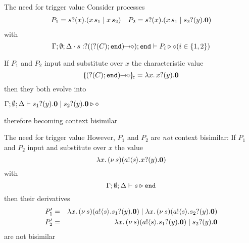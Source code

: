 \documentclass{beamer}
\begin{document}
	\begin{frame}{The need for trigger value}
		Consider processes %
		\begin{eqnarray*}
			P_1 = s ? (x) . (x\, {s_1} \;|\; x\, {s_2}) 
			& & 
			P_2 = s ? (x) . (x\, {s_1} \;|\; s_2 ? (y) . \mathbf{0}) 
		\end{eqnarray*}
		with
		\[
			\Gamma; \emptyset; \Delta \cdot s: ? ((? (C) ; \mathtt{end})\!\! \rightarrow\!\! \diamond) ; \mathtt{end} \vdash P_i \triangleright \diamond (i \in \{1,2\})
		\]

		If $P_1$ and $P_2$ input and substitute over $x$
		the characteristic value
		\[
			\omapchar{\shot{(\btinp{C} \tinact)}} = \abs{x}{\binp{x}{y} \inact}
		\] 
		then they both evolve into %
		\begin{center}
			$\Gamma; \emptyset; \Delta \vdash s_1 ? (y) . \mathbf{0} \;|\; s_2 ? (y) . \mathbf{0} \triangleright \diamond$
		\end{center}
		\noi therefore becoming 
		context bisimilar
	\end{frame}

	\begin{frame}{The need for trigger value}
		However, $P_1$ and $P_2$
		are
		{\em not} context bisimilar:
		If 
		$P_1$ and $P_2$ input and substitute over $x$ the value
		\[
			\lambda x.\,(\nu\, s)(a ! \langle s \rangle . x ? (y) . \mathbf{0})
		\]
		with
		\[
			\Gamma; \emptyset; \Delta \vdash s \triangleright \mathtt{end}
		\]
		then their derivatives
		\begin{eqnarray*}
			P_1' &=& \lambda x.\,(\nu\, s)(a ! \langle s \rangle . s_1 ? (y) . \mathbf{0}) \;|\; \lambda x.\,(\nu\, s)(a ! \langle s \rangle . s_2 ? (y) . \mathbf{0})\\
			P_2' &=& \lambda x.\,(\nu\, s)(a ! \langle s \rangle . s_1 ? (y) . \mathbf{0}) \;|\; s_2 ? (y) . \mathbf{0}
		\end{eqnarray*}
		are not bisimilar
	\end{frame}
\end{document}
